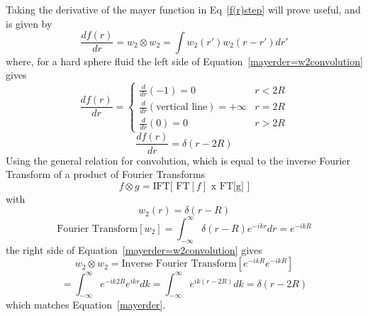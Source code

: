 \documentclass[double,12pt]{beavtex}
\begin{document}
Taking the derivative of the mayer function in Eq~\ref{f(r)step} will prove useful, and is given by
\begin{equation}\label{mayerder=w2convolution}{\frac{df(r)}{dr} = w_2 \otimes w_2 = \int{w_2(r')w_2(r-r')dr'}}\end{equation} 
where, for a hard sphere fluid the left side of Equation~\ref{mayerder=w2convolution} gives
\begin{displaymath}{\frac{df(r)}{dr}=\left\{ \begin{array}{rc} \frac{d}{dr}(-1)=0 & r<2R \\\frac{d}{dr}(\text{vertical line})=+\infty & r=2R \\ \frac{d}{dr}(0)=0  & r>2R \end{array}\right.}\end{displaymath}
\begin{equation}\label{mayerder}{\frac{df(r)}{dr} = \delta(r-2R)}\end{equation} 
Using the general relation for convolution, which is equal to the inverse Fourier Transform of a product of Fourier Transforms \begin{equation}{f \otimes g = \text{IFT[ FT}[f]\text{ x FT[g] }]}\end{equation} with
\begin{equation}{w_2(r)=\delta(r-R)}\end{equation} 
\begin{equation}{\text{Fourier Transform}[w_2]=\int_{-\infty}^{\infty}\delta(r-R)e^{-ikr}dr=e^{-ikR}}\end{equation} 
the right side of Equation~\ref{mayerder=w2convolution} gives
\begin{equation}{w_2 \otimes w_2 = \text{Inverse Fourier Transform}[e^{-ikR}e^{-ikR}]}\end{equation} 
\begin{equation}\label{w2convolution}{=\int_{-\infty}^{\infty}e^{-ik2R}e^{ikr}dk=\int_{-\infty}^{\infty}e^{ik(r-2R)}dk=\delta(r-2R)}\end{equation} 
which matches Equation~\ref{mayerder}.
\end{document}
